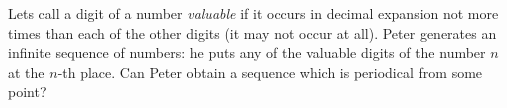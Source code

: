 \problem
Lets call a digit of a number \emph{valuable} if it occurs in decimal expansion
not more times than each of the other digits (it may not occur at all).
Peter generates an infinite sequence of numbers: he puts
any of the valuable digits of the number $n$ at the $n$-th place.
Can Peter obtain a sequence which is periodical from some point?
\solution
\endproblem
